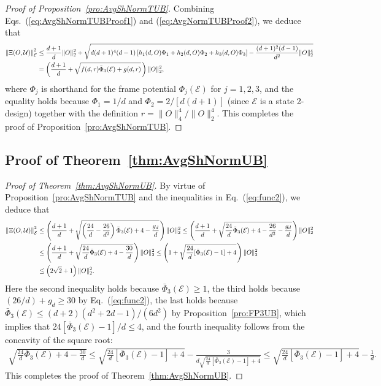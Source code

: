 \documentclass[aps,pra,twocolumn,nofootinbib,superscriptaddress,10pt]{revtex4-2}
\newcommand{\lsp}{\mkern 2mu}           %
\newcommand{\caE}{\mathcal{E}}
\newcommand{\caU}{\mathcal{U}}
\newcommand{\bPhi}{\bar{\Phi}}
\newcommand{\eref}[1]{Eq.~\textup{(\ref{#1})}}
\newcommand{\eqsref}[2]{Eqs.~(\ref{#1}) and (\ref{#2})}
\newcommand{\pref}[1]{Proposition~\ref{#1}}
\newcommand{\thref}[1]{Theorem~\ref{#1}}
\begin{document}
\begin{proof}[Proof of \pref{pro:AvgShNormTUB}]
Combining \eqsref{eq:AvgShNormTUBProof1}{eq:AvgNormTUBProof2}, we deduce that
\begin{align}
    \left\|\Xi(O,\caU)\right\|_\caE^2 &\le\frac{d+1}{d}\|O\|_2^2 +\sqrt{d(d+1)^4(d-1)\left[h_1(d,O)\Phi_1+h_2(d,O)\Phi_2+h_3(d,O)\Phi_3\right]-\frac{(d+1)^2(d-1)}{d^2}\|O\|_2^4}\nonumber\\
    &=\left(\frac{d+1}{d}+\sqrt{f(d,r)\bPhi_3(\caE)+g(d,r)}\lsp\right)\|O\|_2^2, \label{eq:avg_G_up}
\end{align}
where $\Phi_j$ is shorthand for the frame potential $\Phi_j(\caE)$ for $j=1, 2, 3$, and the equality holds because $\Phi_1=1/d$ and $\Phi_2=2/[d(d+1)]$ (since $\caE$ is a state 2-design) together with the definition $r=\|O\|_4^4/\|O\|_2^4$. This completes the proof of \pref{pro:AvgShNormTUB}.
\end{proof}

\subsection{Proof of \thref{thm:AvgShNormUB}}
\begin{proof}[Proof of \thref{thm:AvgShNormUB}]
By virtue of \pref{pro:AvgShNormTUB} and the inequalities in \eref{eq:func2}, we deduce that
\begin{align}  \left\|\Xi(O,\caU)\right\|_\caE^2 &\le \left(\frac{d+1}{d} + \sqrt{\left(\frac{24}{d}-\frac{26}{d^2}\right)\bPhi_3(\caE) + 4 - \frac{g_d}{d}}\lsp\right)\|O\|_2^2\le \left(\frac{d+1}{d} + \sqrt{\frac{24}{d}\bPhi_3(\caE) + 4 - \frac{26}{d^2} -\frac{g_d}{d}}\lsp\right)\|O\|_2^2\nonumber\\
    &\le \left(\frac{d+1}{d} + \sqrt{\frac{24}{d}\bPhi_3(\caE) + 4 - \frac{30}{d}}\lsp\right)\|O\|_2^2\leq \left(1 + \sqrt{\frac{24}{d}[\bPhi_3(\caE)-1] + 4 }\lsp\right)\|O\|_2^2\nonumber\\
    &\le \left(2\sqrt{2}+1\right)\|O\|_2^2.
\end{align}
Here the second inequality holds because $\bPhi_3(\caE)\ge 1$, the third holds because $(26/d)+g_d\geq 30$ by \eref{eq:func2}, the last holds because $\bPhi_3(\caE) \le (d + 2)(d^2 + 2d - 1)/(6d^2)$ by \pref{pro:FP3UB}, which implies that $24[\bPhi_3(\caE)-1]/d\leq 4$, and the fourth inequality follows from the concavity of the square root:
\begin{align}
\sqrt{\frac{24}{d}\bPhi_3(\caE) + 4 - \frac{30}{d}}\leq
\sqrt{\frac{24}{d}[\bPhi_3(\caE)-1] + 4 }-\frac{3}{d\sqrt{\frac{24}{d}[\bPhi_3(\caE)-1] + 4 }} \leq
\sqrt{\frac{24}{d}[\bPhi_3(\caE)-1] + 4 }-\frac{1}{d}.
\end{align}
This completes the proof of \thref{thm:AvgShNormUB}.
\end{proof}
\end{document}
